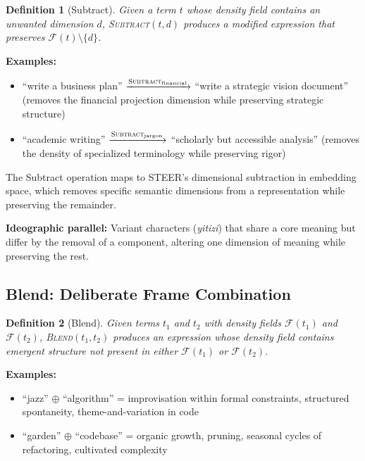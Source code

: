 \documentclass[12pt,a4paper]{article}
\newtheorem{definition}{Definition}[section]
\begin{document}
\begin{definition}[Subtract]
Given a term $t$ whose density field contains an unwanted dimension $d$, \textsc{Subtract}$(t, d)$ produces a modified expression that preserves $\mathcal{F}(t) \setminus \{d\}$.
\end{definition}

\textbf{Examples:}
\begin{itemize}
  \item ``write a business plan'' $\xrightarrow{\textsc{Subtract}_{\text{financial}}}$ ``write a strategic vision document'' (removes the financial projection dimension while preserving strategic structure)
  \item ``academic writing'' $\xrightarrow{\textsc{Subtract}_{\text{jargon}}}$ ``scholarly but accessible analysis'' (removes the density of specialized terminology while preserving rigor)
\end{itemize}

The Subtract operation maps to STEER's dimensional subtraction in embedding space, which removes specific semantic dimensions from a representation while preserving the remainder.

\textbf{Ideographic parallel:}
Variant characters (\textit{yitizi}) that share a core meaning but differ by the removal of a component, altering one dimension of meaning while preserving the rest.

\subsection{Blend: Deliberate Frame Combination}
\label{subsec:blend}

\begin{definition}[Blend]
Given terms $t_1$ and $t_2$ with density fields $\mathcal{F}(t_1)$ and $\mathcal{F}(t_2)$, \textsc{Blend}$(t_1, t_2)$ produces an expression whose density field contains emergent structure not present in either $\mathcal{F}(t_1)$ or $\mathcal{F}(t_2)$.
\end{definition}

\textbf{Examples:}
\begin{itemize}
  \item ``jazz'' $\oplus$ ``algorithm'' = improvisation within formal constraints, structured spontaneity, theme-and-variation in code
  \item ``garden'' $\oplus$ ``codebase'' = organic growth, pruning, seasonal cycles of refactoring, cultivated complexity
\end{itemize}
\end{document}

